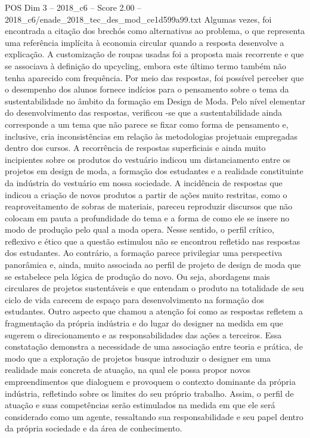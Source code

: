 \begin{textsample}{POS Dim 3 – 2018\_c6 – Score 2.00 – 2018\_c6/enade\_2018\_tec\_des\_mod\_ce1d599a99.txt}
Algumas vezes, foi encontrada a citação dos brechós como alternativas ao problema, o que representa uma referência implícita à economia circular quando a resposta desenvolve a explicação.
A customização de roupas usadas foi a proposta mais recorrente e que se associava à definição do upcycling, embora este último termo também não tenha aparecido com frequência.
Por meio das respostas, foi possível perceber que o desempenho dos alunos fornece indícios para o pensamento sobre o tema da sustentabilidade no âmbito da formação em Design de Moda.
Pelo nível elementar do desenvolvimento das respostas, verificou -se que a sustentabilidade ainda corresponde a um tema que não parece se fixar como forma de pensamento e, inclusive, cria inconsistências em relação às metodologias projetuais empregadas dentro dos cursos.
A recorrência de respostas superficiais e ainda muito incipientes sobre os produtos do vestuário indicou um distanciamento entre os projetos em design de moda, a formação dos estudantes e a realidade constituinte da indústria do vestuário em nossa sociedade.
A incidência de respostas que indicou a criação de novos produtos a partir de ações muito restritas, como o reaproveitamento de sobras de materiais, pareceu reproduzir discursos que não colocam em pauta a profundidade do tema e a forma de como ele se insere no modo de produção pelo qual a moda opera.
Nesse sentido, o perfil crítico, reflexivo e ético que a questão estimulou não se encontrou refletido nas respostas dos estudantes.
Ao contrário, a formação parece privilegiar uma perspectiva panorâmica e, ainda, muito associada ao perfil de projeto de design de moda que se estabelece pela lógica de produção do novo.
Ou seja, abordagens mais circulares de projetos sustentáveis e que entendam o produto na totalidade de seu ciclo de vida carecem de espaço para desenvolvimento na formação dos estudantes.
Outro aspecto que chamou a atenção foi como as respostas refletem a fragmentação da própria indústria e do lugar do designer na medida em que sugerem o direcionamento e as responsabilidades das ações a terceiros.
Essa constatação demonstra a necessidade de uma associação entre teoria e prática, de modo que a exploração de projetos busque introduzir o designer em uma realidade mais concreta de atuação, na qual ele possa propor novos empreendimentos que dialoguem e provoquem o contexto dominante da própria indústria, refletindo sobre os limites do seu próprio trabalho.
Assim, o perfil de atuação e suas competências serão estimulados na medida em que ele será considerado como um agente, ressaltando sua responsabilidade e seu papel dentro da própria sociedade e da área de conhecimento.

\end{textsample}
